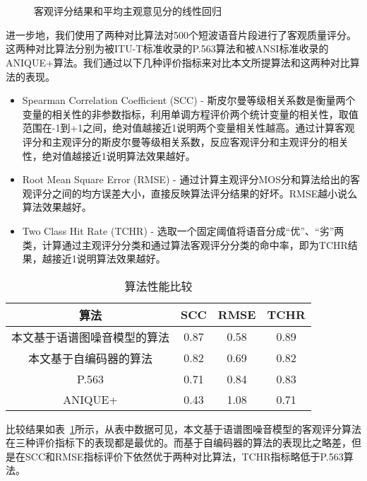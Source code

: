 \begin{figure}
\centering
{}
\vspace{0.6ex}
\\
\vspace{0.8ex}
\\
\caption{客观评分结果和平均主观意见分的线性回归\label{fig:regress}}
\end{figure}

进一步地，我们使用了两种对比算法对500个短波语音片段进行了客观质量评分。这两种对比算法分别为被ITU-T标准收录的P.563算法和被ANSI标准收录的ANIQUE+算法。我们通过以下几种评价指标来对比本文所提算法和这两种对比算法的表现。

\begin{itemize}
\item Spearman Correlation Coefficient (SCC) - 斯皮尔曼等级相关系数是衡量两个变量的相关性的非参数指标，利用单调方程评价两个统计变量的相关性，取值范围在-1到+1之间，绝对值越接近1说明两个变量相关性越高。通过计算客观评分和主观评分的斯皮尔曼等级相关系数，反应客观评分和主观评分的相关性，绝对值越接近1说明算法效果越好。
\item Root Mean Square Error (RMSE) - 通过计算主观评分MOS分和算法给出的客观评分之间的均方误差大小，直接反映算法评分结果的好坏。RMSE越小说么算法效果越好。
\item Two Class Hit Rate (TCHR) - 选取一个固定阈值将语音分成“优”、“劣”两类，计算通过主观评分分类和通过算法客观评分分类的命中率，即为TCHR结果，越接近1说明算法效果越好。
\end{itemize}

\begin{table}
\centering
\caption{算法性能比较}
\label{tab:alg-compare}
\begin{tabular}{cccc}
\toprule[1.5pt]
算法 & SCC & RMSE & TCHR \\ \midrule[1pt]
本文基于语谱图噪音模型的算法 & 0.87 & 0.58 & 0.89 \\
本文基于自编码器的算法 & 0.82 & 0.69 & 0.82 \\
P.563 & 0.71 & 0.84 & 0.83 \\
ANIQUE+ & 0.43 & 1.08 & 0.71 \\
\end{tabular}
\end{table}

比较结果如表~\ref{tab:alg-compare}所示，从表中数据可见，本文基于语谱图噪音模型的客观评分算法在三种评价指标下的表现都是最优的。而基于自编码器的算法的表现比之略差，但是在SCC和RMSE指标评价下依然优于两种对比算法，TCHR指标略低于P.563算法。

